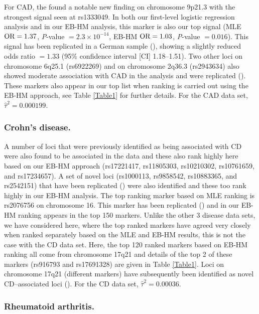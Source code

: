 For CAD, the
\citet{allison2006}
found a notable new finding on chromosome 9p21.3 with the
strongest signal seen at rs1333049. In both our first-level
logistic regression analysis and in our EB-HM analysis,
this marker is also our top signal (MLE $\hbox{OR} = 1.37$,
\textit{P}-value $= 2.3 \times 10^{-14}$,
EB-HM $\hbox{OR} = 1.03$, \textit{P}-value $= 0.016$).
This signal has been replicated in a German sample
(\citealp{Duditetal02}),
showing a slightly reduced odds ratio $= 1.33$
(95\% confidence interval [CI] 1.18--1.51). Two other
loci on chromosome 6q25.1 (rs6922269) and on chromosome
2q36.3 (rs2943634) also showed moderate association with
CAD in the
\citet{rma2003}
analysis and were replicated
(\citealp{LW2004}).
These markers also appear in our top list when ranking
is carried out using the EB-HM approach, see
Table \ref{Table1} for further details. For the CAD data
set, $\hat{\tau}^2 = 0.000199$.


\subsubsection{Crohn's disease.}

A number of loci that were previously identified as being
associated with CD were also found to be associated in the
\citet{tomlins2005}
data and these also rank highly here based on our EB-HM
approach (rs17221417, rs11805303, rs10210302, rs10761659,
and rs17234657). A set of novel loci (rs1000113, rs9858542,
rs10883365, and rs2542151) that have been replicated
(\citealp{TTC01})
were also identified and these too rank highly in our
EB-HM analysis. The top ranking marker based on MLE
ranking is rs2076756 on chromosome 16. This marker has
been replicated
(\citealp{Gichangi_Vach:2006})
and in our EB-HM ranking appears in the top 150 markers.
Unlike the other 3 disease data sets, we have considered
here, where the top ranked markers have agreed very
closely when ranked separately based on the MLE and EB-HM
results, this is not the case with the CD data set. Here,
the top 120 ranked markers based on EB-HM ranking all come
from chromosome 17q21 and details of the top 2 of these
markers (rs916793 and rs17691328) are given in
Table \ref{Table1}. Loci on chromosome 17q21 (different
markers) have subsequently been identified as novel
CD--associated loci
(\citealp{Barlow_Bartholomew:1972}).
For the CD data set, $\hat{\tau}^2 = 0.00036$.


\subsubsection{Rheumatoid arthritis.}

